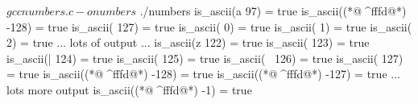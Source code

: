 \documentclass[12pt, oneside, landscape]{article}
\begin{document}

\begin{shell}
$ gcc numbers.c -o numbers
$ ./numbers 
is_ascii(a 97) = true
is_ascii((*@^^^^fffd@*) -128) = true
is_ascii( 127) = true
is_ascii( 0) = true
is_ascii( 1) = true
is_ascii( 2) = true
... lots of output ... 
is_ascii(z 122) = true
is_ascii({ 123) = true
is_ascii(| 124) = true
is_ascii(} 125) = true
is_ascii(~ 126) = true
is_ascii( 127) = true
is_ascii((*@^^^^fffd@*) -128) = true
is_ascii((*@^^^^fffd@*) -127) = true
... lots more output
is_ascii((*@^^^^fffd@*) -1) = true
\end{shell}

\newpage


\end{document}

